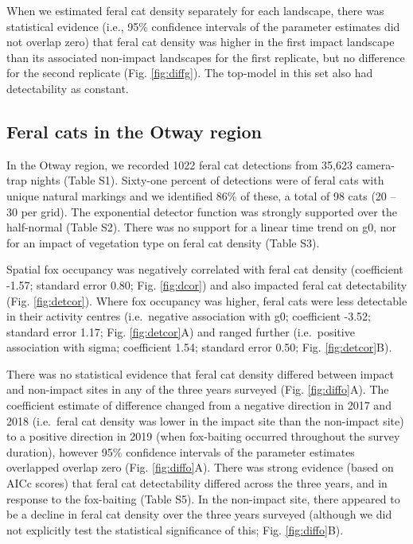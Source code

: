 \documentclass[]{elsarticle} %
\begin{document}
When we estimated feral cat density separately for each landscape, there was statistical evidence (i.e., 95\% confidence intervals of the parameter estimates did not overlap zero) that feral cat density was higher in the first impact landscape than its associated non-impact landscapes
for the first replicate, but no difference for the second replicate (Fig. \ref{fig:diffg}). The top-model in this set also had detectability as constant.

\hypertarget{feral-cats-in-the-otway-region}{%
\subsection{Feral cats in the Otway region}\label{feral-cats-in-the-otway-region}}

In the Otway region, we recorded 1022 feral cat detections from 35,623 camera-trap nights (Table S1). Sixty-one percent of detections were of feral cats with unique natural markings and we identified 86\% of these, a total of 98 cats (20 -- 30 per grid). The exponential detector function was strongly supported over the half-normal (Table S2). There was no support for a linear time trend on g0, nor for an impact of vegetation type on feral cat density (Table S3).

Spatial fox occupancy was negatively correlated with feral cat density (coefficient -1.57; standard error 0.80; Fig. \ref{fig:dcor}) and also impacted feral cat detectability (Fig. \ref{fig:detcor}). Where fox occupancy was higher, feral cats were less detectable in their activity centres (i.e.~negative association with g0; coefficient -3.52; standard error 1.17; Fig. \ref{fig:detcor}A) and ranged further (i.e.~positive association with sigma; coefficient 1.54; standard error 0.50; Fig. \ref{fig:detcor}B).

There was no statistical evidence that feral cat density differed between impact and non-impact sites in any of the three years surveyed (Fig. \ref{fig:diffo}A). The coefficient estimate of difference changed from a negative direction in 2017 and 2018 (i.e.~feral cat density was lower in the impact site than the non-impact site) to a positive direction in 2019 (when fox-baiting occurred throughout the survey duration), however 95\% confidence intervals of the parameter estimates overlapped overlap zero (Fig. \ref{fig:diffo}A). There was strong evidence (based on AICc scores) that feral cat detectability differed across the three years, and in response to the fox-baiting (Table S5). In the non-impact site, there appeared to be a decline in feral cat density over the three years surveyed (although we did not explicitly test the statistical significance of this; Fig. \ref{fig:diffo}B).
\end{document}
